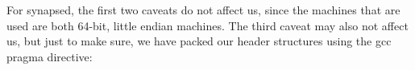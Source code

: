 For synapsed, the first two caveats do not affect us, since the machines that 
are used are both 64-bit, little endian machines. The third caveat may also not 
affect us, but just to make sure, we have packed our header structures using 
the gcc pragma directive:



